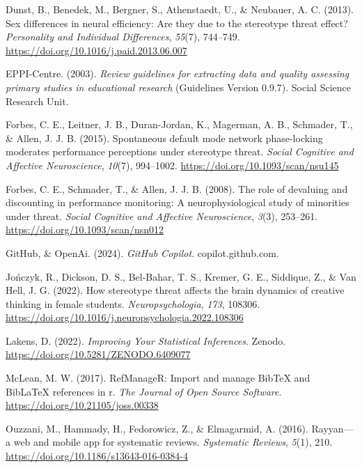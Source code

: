 \documentclass[
  stu]{apa7}
\newlength{\cslhangindent}
\newenvironment{CSLReferences}[2] %
 {\begin{list}{}{%
  \setlength{\itemindent}{0pt}
  \setlength{\leftmargin}{0pt}
  \setlength{\parsep}{0pt}
  \ifodd #1
   \setlength{\leftmargin}{\cslhangindent}
   \setlength{\itemindent}{-1\cslhangindent}
  \fi
  \setlength{\itemsep}{#2\baselineskip}}}
 {\end{list}}
\begin{document}
\begin{CSLReferences}{1}{0}
Dunst, B., Benedek, M., Bergner, S., Athenstaedt, U., \& Neubauer, A. C. (2013). Sex differences in neural efficiency: {Are} they due to the stereotype threat effect? \emph{Personality and Individual Differences}, \emph{55}(7), 744--749. \url{https://doi.org/10.1016/j.paid.2013.06.007}

EPPI-Centre. (2003). \emph{Review guidelines for extracting data and quality assessing primary studies in educational research} (Guidelines Version 0.9.7). Social Science Research Unit.

Forbes, C. E., Leitner, J. B., Duran-Jordan, K., Magerman, A. B., Schmader, T., \& Allen, J. J. B. (2015). Spontaneous default mode network phase-locking moderates performance perceptions under stereotype threat. \emph{Social Cognitive and Affective Neuroscience}, \emph{10}(7), 994--1002. \url{https://doi.org/10.1093/scan/nsu145}

Forbes, C. E., Schmader, T., \& Allen, J. J. B. (2008). The role of devaluing and discounting in performance monitoring: A neurophysiological study of minorities under threat. \emph{Social Cognitive and Affective Neuroscience}, \emph{3}(3), 253--261. \url{https://doi.org/10.1093/scan/nsn012}

GitHub, \& OpenAi. (2024). \emph{{GitHub Copilot}}. copilot.github.com.

Jończyk, R., Dickson, D. S., Bel-Bahar, T. S., Kremer, G. E., Siddique, Z., \& Van Hell, J. G. (2022). How stereotype threat affects the brain dynamics of creative thinking in female students. \emph{Neuropsychologia}, \emph{173}, 108306. \url{https://doi.org/10.1016/j.neuropsychologia.2022.108306}

Lakens, D. (2022). \emph{Improving {Your Statistical Inferences}}. Zenodo. \url{https://doi.org/10.5281/ZENODO.6409077}

McLean, M. W. (2017). RefManageR: Import and manage BibTeX and BibLaTeX references in r. \emph{The Journal of Open Source Software}. \url{https://doi.org/10.21105/joss.00338}

Ouzzani, M., Hammady, H., Fedorowicz, Z., \& Elmagarmid, A. (2016). Rayyan---a web and mobile app for systematic reviews. \emph{Systematic Reviews}, \emph{5}(1), 210. \url{https://doi.org/10.1186/s13643-016-0384-4}


\end{CSLReferences}
\end{document}
